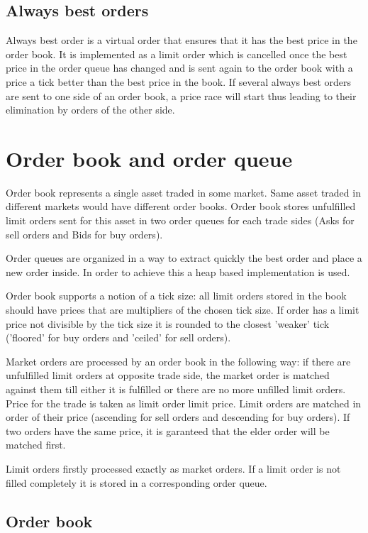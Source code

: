\documentclass[a4paper,11pt]{article}
\begin{document}
\subsection{Always best orders}

Always best order is a virtual order that ensures that it has the best price in the order book. It is implemented as a limit order which is cancelled once the best price in the order queue has changed and is sent again to the order book with a price a tick better than the best price in the book. If several always best orders are sent to one side of an order book, a price race will start thus leading to their elimination by orders of the other side.

\section{Order book and order queue}

Order book represents a single asset traded in some market. Same asset traded in different markets would have different order books. Order book stores unfulfilled limit orders sent for this asset in two order queues for each trade sides (Asks for sell orders and Bids for buy orders).

Order queues are organized in a way to extract quickly the best order and place a new order inside. In order to achieve this a heap based implementation is used. 

Order book supports a notion of a tick size: all limit orders stored in the book should have prices that are multipliers of the chosen tick size. If order has a limit price not divisible by the tick size it is rounded to the closest 'weaker' tick ('floored' for buy orders and 'ceiled' for sell orders).

Market orders are processed by an order book in the following way: if there are unfulfilled limit orders at opposite trade side, the market order is matched against them till either it is fulfilled or there are no more unfilled limit orders. Price for the trade is taken as limit order limit price. Limit orders are matched in order of their price (ascending for sell orders and descending for buy orders). If two orders have the same price, it is garanteed that the elder order will be matched first.

Limit orders firstly processed exactly as market orders. If a limit order is not filled completely it is stored in a corresponding order queue.

\subsection{Order book}
\end{document}
